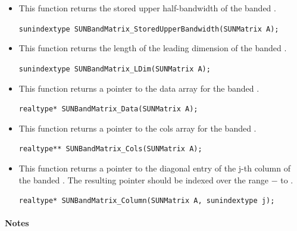 \begin{itemize}
\item {}

  This function returns the stored upper half-bandwidth of the banded .

  \verb|sunindextype SUNBandMatrix_StoredUpperBandwidth(SUNMatrix A);|


\item {}

  This function returns the length of the leading dimension of the banded .

  \verb|sunindextype SUNBandMatrix_LDim(SUNMatrix A);|


\item {}

  This function returns a pointer to the data array for the banded .

  \verb|realtype* SUNBandMatrix_Data(SUNMatrix A);|


\item {}

  This function returns a pointer to the cols array for the banded .

  \verb|realtype** SUNBandMatrix_Cols(SUNMatrix A);|


\item {}

  This function returns a pointer to the diagonal entry of the j-th
  column of the banded .  The resulting pointer should
  be indexed over the range $-$ to .

  \verb|realtype* SUNBandMatrix_Column(SUNMatrix A, sunindextype j);|

\end{itemize}
\paragraph{\bf Notes}

